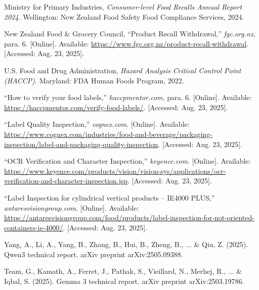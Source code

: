 \documentclass[conference]{IEEEtran}
\begin{document}
\begin{thebibliography}{1}
Ministry for Primary Industries, \emph{Consumer-level Food Recalls Annual Report 2024}. Wellington: New Zealand Food Safety Food Compliance Services, 2024.

New Zealand Food \& Grocery Council, “Product Recall Withdrawal,” \emph{fgc.org.nz}, para. 6. [Online]. Available: \url{https://www.fgc.org.nz/product-recall-withdrawal}. [Accessed: Aug. 23, 2025].

U.S. Food and Drug Administration, \emph{Hazard Analysis Critical Control Point (HACCP)}. Maryland: FDA Human Foods Program, 2022.

“How to verify your food labels,” \emph{haccpmentor.com}, para. 6. [Online]. Available: \url{https://haccpmentor.com/verify-food-labels/}. [Accessed: Aug. 23, 2025].

“Label Quality Inspection,” \emph{cognex.com}. [Online]. Available: \url{https://www.cognex.com/industries/food-and-beverage/packaging-inspection/label-and-packaging-quality-inspection}. [Accessed: Aug. 23, 2025].

“OCR Verification and Character Inspection,” \emph{keyence.com}. [Online]. Available: \url{https://www.keyence.com/products/vision/vision-sys/applications/ocr-verification-and-character-inspection.jsp}. [Accessed: Aug. 23, 2025].

“Label Inspection for cylindrical vertical products – IE4000 PLUS,” \emph{antaresvisiongroup.com}. [Online]. Available: \url{https://antaresvisiongroup.com/food/products/label-inspection-for-not-oriented-containers-ie-4000/}. [Accessed: Aug. 23, 2025].

Yang, A., Li, A., Yang, B., Zhang, B., Hui, B., Zheng, B., ... & Qiu, Z. (2025). Qwen3 technical report. arXiv preprint arXiv:2505.09388.

Team, G., Kamath, A., Ferret, J., Pathak, S., Vieillard, N., Merhej, R., ... & Iqbal, S. (2025). Gemma 3 technical report. arXiv preprint arXiv:2503.19786.

\end{thebibliography}
\end{document}
